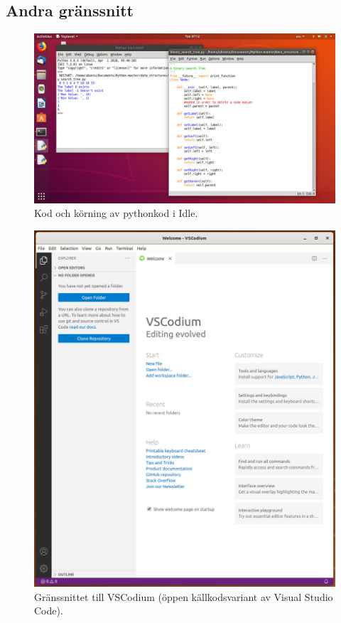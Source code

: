 \subsection{Andra gränssnitt}

\begin{frame}
  \begin{figure}
    \centering
    \includegraphics[height=0.8\textheight]{figs/idle.jpg}
    \caption{Kod och körning av pythonkod i Idle.}
  \end{figure}
\end{frame}

\begin{frame}
  \begin{figure}
    \centering
    \includegraphics[height=0.8\textheight]{figs/codium.png}
    \caption{Gränssnittet till VSCodium (öppen källkodsvariant av Visual Studio 
    Code).}
  \end{figure}
\end{frame}

